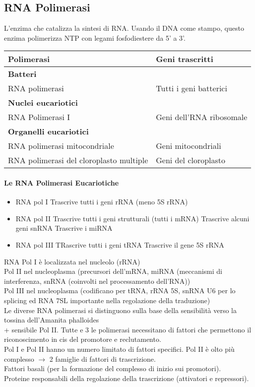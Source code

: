 \documentclass{article}
\begin{document}
\subsection{RNA Polimerasi}
L'enzima che catalizza la sintesi di RNA. Usando il DNA come stampo, questo enzima polimerizza NTP con legami fosfodiestere da 5' a 3'.
\begin{center}
    \begin{tabular}{ll}
        \toprule
        Polimerasi & Geni trascritti \\
        \midrule
        \textbf{Batteri} & \\
        RNA polimerasi & Tutti i geni batterici \\
        \midrule
        \textbf{Nuclei eucariotici} & \\
        RNA Polimerasi I & Geni dell'RNA ribosomale \\
        \midrule
        \textbf{Organelli eucariotici} &  \\
        RNA polimerasi mitocondriale & Geni mitocondriali\\
        RNA polimerasi del cloroplasto multiple & Geni del cloroplasto\\
        \bottomrule
    \end{tabular}
\end{center}
\paragraph{Le RNA Polimerasi Eucariotiche}
\begin{itemize}
    \item RNA pol I
    \subitem Trascrive tutti i geni rRNA (meno 5S rRNA)
    \item RNA pol II
    \subitem Trascrive tutti i geni strutturali (tutti i mRNA)
    \subitem Trascrive alcuni geni snRNA
    \subitem Trascrive i miRNA
    \item RNA pol III
    \subitem TRascrive tutti i geni tRNA
    \subitem Trascrive il gene 5S rRNA
\end{itemize}
RNA Pol I è localizzata nel nucleolo (rRNA)\\
Pol II nel nucleoplasma (precursori dell'mRNA, miRNA (meccanismi di interferenza, snRNA (coinvolti nel processamento dell'RNA))\\
Pol III nel nucleoplasma (codificano per tRNA, rRNA 5S, snRNA U6 per lo splicing ed RNA 7SL importante nella
regolazione della traduzione)\\
Le diverse RNA polimerasi si distinguono sulla base della sensibilità verso la tossina dell'Amanita
phalloides \\+ sensibile Pol II.
Tutte e 3 le polimerasi necessitano di fattori che permettono il riconoscimento in cis del promotore e reclutamento.\\
Pol I e Pol II hanno un numero limitato di fattori specifici. Pol II è olto più complesso $\rightarrow$ 2 famiglie di fattori di trascrizione.\\
Fattori basali (per la formazione del complesso di inizio sui promotori).\\
Proteine responsabili della regolazione della trascrizione (attivatori e repressori).
\end{document}
